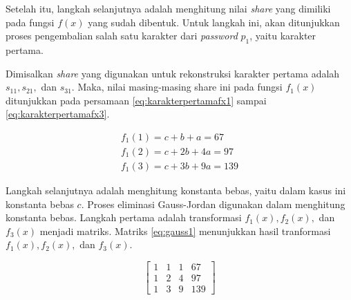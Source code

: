 Setelah itu, langkah selanjutnya adalah menghitung nilai \textit{share} yang dimiliki pada fungsi \begin{math}f(x)\end{math} yang sudah dibentuk. Untuk langkah ini, akan ditunjukkan proses pengembalian salah satu karakter dari \textit{password} \begin{math}p_1\end{math}, yaitu karakter pertama.

Dimisalkan \textit{share} yang digunakan untuk rekonstruksi karakter pertama adalah \begin{math}s_{11}, s_{21}, \end{math} dan \begin{math}s_{31}\end{math}. Maka, nilai masing-masing share ini pada fungsi \begin{math}f_1(x)\end{math} ditunjukkan pada persamaan \ref{eq:karakterpertamafx1} sampai \ref{eq:karakterpertamafx3}.

\begin{align}
	f_1(1) = c + b + a = 67 \label{eq:karakterpertamafx1} \\
	f_1(2) = c + 2b + 4a = 97 \label{eq:karakterpertamafx2} \\
	f_1(3) = c + 3b + 9a = 139 \label{eq:karakterpertamafx3}
\end{align}

Langkah selanjutnya adalah menghitung konstanta bebas, yaitu dalam kasus ini konstanta bebas \begin{math}c\end{math}. Proses eliminasi Gauss-Jordan digunakan dalam menghitung konstanta bebas. Langkah pertama adalah transformasi \begin{math}f_1(x), f_2(x),\end{math} dan \begin{math}f_3(x)\end{math} menjadi matriks. Matriks \ref{eq:gauss1} menunjukkan hasil tranformasi \begin{math}f_1(x), f_2(x),\end{math} dan \begin{math}f_3(x)\end{math}.

\begin{center}
	\setlength\arraycolsep{10pt}
	\begin{equation}
		\begin{bmatrix}
				1 	& 1 	& 1 	& 67 		\\[1em]
				1 	& 2 	& 4 	& 97 		\\[1em]
				1 	& 3 	& 9 	& 139
		\end{bmatrix}
		\label{eq:gauss1}
	\end{equation}
\end{center}

